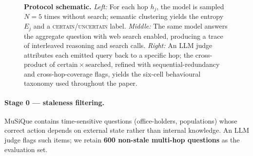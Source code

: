 \documentclass[10pt,letterpaper]{article}
\begin{document}
\begin{figure}[ht]
{%
}
\caption{\textbf{Protocol schematic.} \emph{Left:} For each hop $h_j$, the model is sampled $N{=}5$ times without search; semantic clustering yields the entropy $E_j$ and a \textsc{certain}/\textsc{uncertain} label. \emph{Middle:} The same model answers the aggregate question with web search enabled, producing a trace of interleaved reasoning and search calls. \emph{Right:} An LLM judge attributes each emitted query back to a specific hop; the cross-product of $\mathrm{certain}\times\mathrm{searched}$, refined with sequential-redundancy and cross-hop-coverage flags, yields the six-cell behavioural taxonomy used throughout the paper.}
\label{fig:protocol}
\end{figure}

\paragraph{Stage 0 --- staleness filtering.}
MuSiQue contains time-sensitive questions (office-holders, populations) whose correct
action depends on external state rather than internal knowledge. An LLM judge flags
such items; we retain \textbf{600 non-stale multi-hop questions} as the evaluation set.
\end{document}
